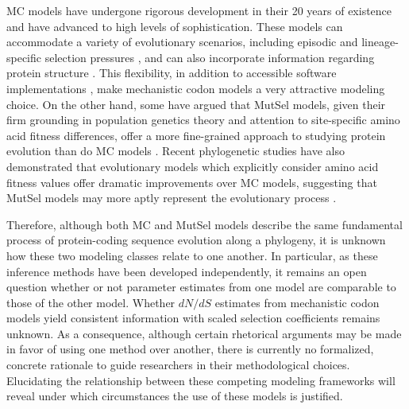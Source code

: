 \documentclass{pnastwo}
\begin{document}
\begin{article}
MC models have undergone rigorous development in their 20 years of existence and have advanced to high levels of sophistication. These models can accommodate a variety of evolutionary scenarios, including episodic \cite{KosakovskyPondetal2011,MEME} and lineage-specific selection pressures \cite{YangNielsen2002,Zhangetal2005,KosakovskyPondFrost2005a}, and can also incorporate information regarding protein structure \cite{Robinsonetal2003,Scherreretal2012,MeyerWilke2012}. This flexibility, in addition to accessible software implementations \cite{KosakovskyPondetal2005,Yang2007,Delport2010}, make mechanistic codon models a very attractive modeling choice. On the other hand, some have argued that MutSel models, given their firm grounding in population genetics theory and attention to site-specific amino acid fitness differences, offer a more fine-grained approach to studying protein evolution than do MC models \cite{HalpernBruno1998,Rodrigueetal2010,Tamurietal2012,Thorne2012}. Recent phylogenetic studies have also demonstrated that evolutionary models which explicitly consider amino acid fitness values offer dramatic improvements over MC models, suggesting that MutSel models may more aptly represent the evolutionary process \cite{Bloom2014a, Bloom2014b}. 

Therefore, although both MC and MutSel models describe the same fundamental process of protein-coding sequence evolution along a phylogeny, it is unknown how these two modeling classes relate to one another. In particular, as these inference methods have been developed independently, it remains an open question whether or not parameter estimates from one model are comparable to those of the other model. Whether $dN/dS$ estimates from mechanistic codon models yield consistent information with scaled selection coefficients remains unknown. As a consequence, although certain rhetorical arguments may be made in favor of using one method over another, there is currently no formalized, concrete rationale to guide researchers in their methodological choices. Elucidating the relationship between these competing modeling frameworks will reveal under which circumstances the use of these models is justified.



\end{article}
\end{document}
